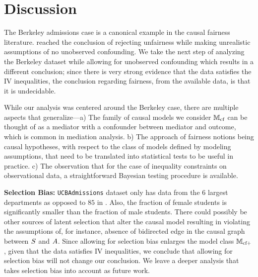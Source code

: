 \section{Discussion}\label{sec:discussion}
The Berkeley admissions case is a canonical example in the causal fairness literature. \citet{BickelHO75} reached the conclusion of rejecting unfairness while making unrealistic assumptions of no unobserved confounding. We take the next step of analyzing the Berkeley dataset while allowing for unobserved confounding which results in a different conclusion; since there is very strong evidence that the data satisfies the IV inequalities, the conclusion regarding fairness, from the available data, is that it is undecidable.

While our analysis was centered around the Berkeley case, there are multiple aspects that generalize---a) \ifdefined \SINGLE The family of causal models we consider \else $\mathbb{M}_{\text{cf}}$ \fi can be thought of as a mediator with a confounder between mediator and outcome, which is common in mediation analysis. b) The approach of fairness notions being causal hypotheses, with respect to the class of models defined by modeling assumptions, that need to be translated into statistical tests to be useful in practice. c) The observation that for the case of inequality constraints on observational data, a straightforward Bayesian testing procedure is available.

\textbf{Selection Bias: } \texttt{UCBAdmissions} dataset only has data from the $6$ largest departments as opposed to $85$ in \cite{BickelHO75}. Also, the fraction of female students is significantly smaller than the fraction of male students. There could possibly be other sources of latent selection that alter the causal model resulting in violating the assumptions of, for instance, absence of bidirected edge in the causal graph between $S$ and $A$. Since allowing for selection bias enlarges the model class $\mathbb{M}_{\text{cf}+}$, given that the data satisfies IV inequalities, we conclude that allowing for selection bias will not change our conclusion. We leave a deeper analysis that takes selection bias into account as future work.

